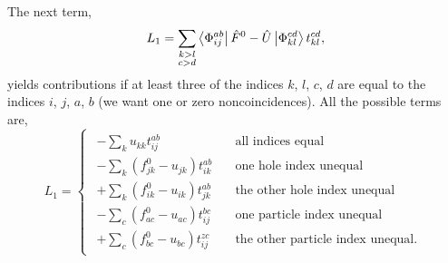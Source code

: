 The next term,
\begin{equation}
    L_1 = \sum_{\substack{k>l \\ c>d}} 
            \bra{\Phi^{ab}_{ij}} \hat{F}^0 - \hat{U} \ket{\Phi^{cd}_{kl}} t^{cd}_{kl},
\end{equation}
yields contributions if at least three of the indices $k$, $l$, $c$, $d$ are equal to 
the indices $i$, $j$, $a$, $b$ (we want one or zero noncoincidences). All the possible
terms are,
\begin{equation}
L_1 = \begin{cases}
\begin{aligned}
     - \sum_k u_{kk} t^{ab}_{ij} &\quad \text{all indices equal} \\
     - \sum_k(f^0_{jk} - u_{jk}) t^{ab}_{ik} &\quad \text{one hole index unequal} \\
     + \sum_k(f^0_{ik} - u_{ik}) t^{ab}_{jk} &\quad \text{the other hole index unequal} \\
     - \sum_c(f^0_{ac} - u_{ac}) t^{bc}_{ij} &\quad \text{one particle index unequal} \\
     + \sum_c(f^0_{bc} - u_{bc}) t^{zc}_{ij} &\quad \text{the other particle index unequal}.
\end{aligned}
\end{cases}
\end{equation}

